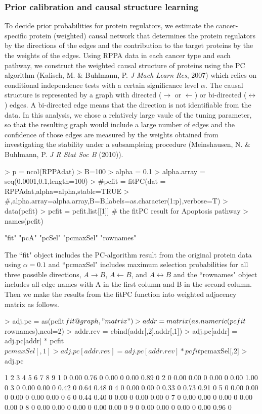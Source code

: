 \documentclass{article}
\begin{document}
\subsubsection{Prior calibration and causal structure learning}
To decide prior probabilities for protein regulators, we estimate the cancer-specific protein (weighted) causal network that determines the protein regulators by the directions of the edges and the contribution to the target proteins by the the weights of the edges. Using RPPA data in each cancer type and each pathway, we construct the weighted causal structure of proteins using the PC algorithm (Kalisch, M. \& Buhlmann, P. {\it J Mach Learn Res}, 2007) which relies on conditional independence tests with a certain significance level $\alpha$. The causal structure is represented by a graph with directed ($
\rightarrow$ or $\leftarrow$) or bi-directed ($\leftrightarrow$) edges. A bi-directed edge means that the direction is not identifiable from the data. In this analysis, we chose a relatively large vaule of the tuning parameter, so that the resulting graph would include a large number of edges and the confidence of those edges are measured by the weights obtained from investigating the stability under a subsampleing procedure (Meinshausen, N. \& Buhlmann, P. {\it J R Stat Soc B} (2010)).
\begin{Schunk}
\begin{Sinput}
> p = ncol(RPPAdat)
> B=100
> alpha = 0.1
> alpha.array = seq(0.0001,0.1,length=100)
> #pcfit = fitPC(dat = RPPAdat,alpha=alpha,stable=TRUE
> #,alpha.array=alpha.array,B=B,labels=as.character(1:p),verbose=T)
> data(pcfit)
> pcfit =  pcfit.list[[1]] # the fitPC result for Apoptosis pathway
> names(pcfit)
\end{Sinput}
\begin{Soutput}
[1] "fit"      "pcA"      "pcSel"    "pcmaxSel" "rownames"
\end{Soutput}
\end{Schunk}
The ``fit" object includes the PC-algorithm result from the original protein data using $\alpha=0.1$ and ``pcmaxSel" includes maximum selection probabilities for all three possible directions, $A\rightarrow B$, $A\leftarrow B$, and $A\leftrightarrow B$ and the ``rownames" object includes all edge names with A in the first column and B in the second column. Then we make the results from the fitPC function into weighted adjacency matrix as follows.
\begin{Schunk}
\begin{Sinput}
> adj.pc = as(pcfit$fit@graph,"matrix")
> addr = matrix(as.numeric(pcfit$rownames),ncol=2)
> addr.rev = cbind(addr[,2],addr[,1])
> adj.pc[addr] = adj.pc[addr] * pcfit$pcmaxSel[,1]
> adj.pc[addr.rev] = adj.pc[addr.rev] * pcfit$pcmaxSel[,2]
> adj.pc
\end{Sinput}
\begin{Soutput}
  1    2    3 4    5 6    7    8 9
1 0 0.00 0.76 0 0.00 0 0.00 0.89 0
2 0 0.00 0.00 0 0.00 0 0.00 1.00 0
3 0 0.00 0.00 0 0.42 0 0.64 0.48 0
4 0 0.00 0.00 0 0.33 0 0.73 0.91 0
5 0 0.00 0.00 0 0.00 0 0.00 0.00 0
6 0 0.44 0.40 0 0.00 0 0.00 0.00 0
7 0 0.00 0.00 0 0.00 0 0.00 0.00 0
8 0 0.00 0.00 0 0.00 0 0.00 0.00 0
9 0 0.00 0.00 0 0.00 0 0.00 0.96 0
\end{Soutput}
\end{Schunk}
\end{document}
